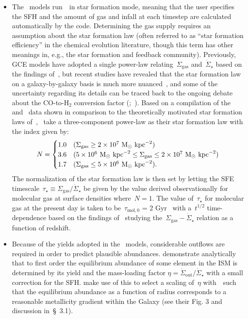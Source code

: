 \documentclass[ms.tex]{subfiles}
\begin{document}
\begin{itemize}
	\item The~\citet{Johnson2021} models run~\vice~in star formation mode, 
	meaning that the user specifies the SFH and the amount of gas and infall at 
	each timestep are calculated automatically by the code. 
	Determining the gas supply requires an assumption about the star formation 
	law (often referred to as ``star formation efficiency'' in the chemical 
	evolution literature, though this term has other meanings in, e.g., the 
	star formation and feedback community). 
	Previously, GCE models have adopted a single power-law 
	relating~$\Sigma_\text{gas}$ and~$\dot{\Sigma}_\star$ based on the 
	findings of~\citet{Kennicutt1998}, but recent studies have revealed that 
	the star formation law on a galaxy-by-galaxy basis is much more 
	nuanced~\citep{delosReyes2019, Ellison2021, Kennicutt2021}, and some of the 
	uncertainty regarding its details can be traced back to the ongoing debate 
	about the CO-to-H$_2$ conversion factor 
	(\citealp{Kennicutt2012};~\citealp*{Liu2015}). 
	Based on a compilation of the~\citet{Bigiel2010} and~\citet{Leroy2013} data 
	shown in comparison to the theoretically motivated star formation laws 
	of~\citet[][see their Fig. 2]{Krumholz2018},~\citet{Johnson2021} take a 
	three-component power-law as their star formation law with the index given 
	by: 
	\begin{equation} 
	N = \begin{cases} 
	1.0 & (\Sigma_\text{gas} \geq 2\times10^7~\text{M}_\odot~\text{kpc}^{-2}) 
	\\ 
	3.6 & (5\times10^6~\text{M}_\odot~\text{kpc}^{-2} \leq \Sigma_\text{gas} \leq 
	2\times10^7~\text{M}_\odot~\text{kpc}^{-2}) 
	\\ 
	1.7 & (\Sigma_\text{gas} \leq 5\times10^6~\text{M}_\odot~\text{kpc}^{-2}). 
	\end{cases} 
	\end{equation} 
	The normalization of the star formation law is then set by letting the 
	SFE timescale~$\tau_\star \equiv \Sigma_\text{gas} / \dot{\Sigma}_\star$ 
	be given by the value derived observationally for molecular gas at surface 
	densities where~$N = 1$. 
	The value of~$\tau_\star$ for molecular gas at the present day is taken to 
	be~$\tau_{\text{mol},0}$ = 2 Gyr~\citep{Leroy2008, Leroy2013} with 
	a~$t^{1/2}$ time-dependence based on the findings of~\citet{Tacconi2018} 
	studying the~$\Sigma_\text{gas}-\dot{\Sigma}_\star$ relation as a function 
	of redshift. 

	\item Because of the yields adopted in the~\citet{Johnson2021} models, 
	considerable outflows are required in order to predict plausible abundances. 
	\citet{Weinberg2017} demonstrate analytically that to first order the 
	equilibrium abundance of some element in the ISM is determined by its yield 
	and the mass-loading factor 
	$\eta = \dot{\Sigma}_\text{out}/\dot{\Sigma}_\star$ with a small 
	correction for the SFH. 
	\citet{Johnson2021} make use of this to select a scaling of~$\eta$ 
	with~\rgal~such that the equilibrium abundance as a function of radius 
	corresponds to a reasonable metallicity gradient within the Galaxy (see 
	their Fig. 3 and discussion in~\S~3.1). 

\end{itemize} 
\end{document}
